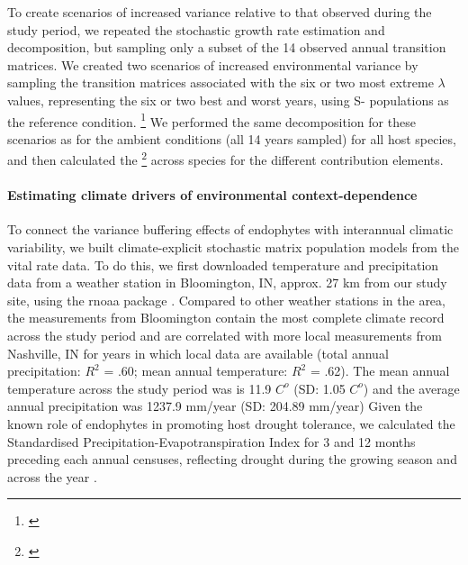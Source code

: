 \documentclass[12pt]{article}
\newcommand{\tom}[2]{{\color{red}{#1}}\footnote{\textit{\color{red}{#2}}}}
\begin{document}
To create scenarios of increased variance relative to that observed during the study period, we repeated the stochastic growth rate estimation and decomposition, but sampling only a subset of the 14 observed annual transition matrices. 
We created two scenarios of increased environmental variance by sampling the transition matrices associated with the six or two most extreme $\lambda$ values, representing the six or two best and worst years, using S- populations as the reference condition. 
\tom{By sampling away from an average year in both directions, the mean value of $\lambda$ remained similar (less than 2.3\% difference) (Fig. S22A), while the standard deviation more than doubled on average across species (Fig. S22B), representing elevated environmental fluctuations.}{I think the stats about changes to mean and variance should be reported separately for the 2 and 6 year cases.}
We performed the same decomposition for these scenarios as for the ambient conditions (all 14 years sampled) for all host species, and then calculated the \tom{mean}{Mean what? You need to be careful with your language because there are many means and many variances in this study.} across species for the different contribution elements.   

\paragraph*{Estimating climate drivers of environmental context-dependence}
To connect the variance buffering effects of endophytes with interannual climatic variability, we built climate-explicit stochastic matrix population models from the vital rate data.
To do this, we first downloaded temperature and precipitation data from a weather station in Bloomington, IN,  approx. 27 km from our study site, using the rnoaa package \cite{chamberlain2022package}. 
Compared to other weather stations in the area, the measurements from Bloomington contain the most complete climate record across the study period and are correlated with more local measurements from Nashville, IN for years in which local data are available (total annual precipitation: $R^2$ = .60; mean annual temperature: $R^2$ = .62).
The mean annual temperature across the study period was is 11.9 $C^o $ (SD: 1.05 $C^o $) and the average annual precipitation was 1237.9 mm/year (SD: 204.89 mm/year)
Given the known role of endophytes in promoting host drought tolerance, we calculated the Standardised Precipitation-Evapotranspiration Index for 3 and 12 months preceding each annual censuses, reflecting drought during the growing season and across the year \cite{vicente2010multiscalar}.
\end{document}
